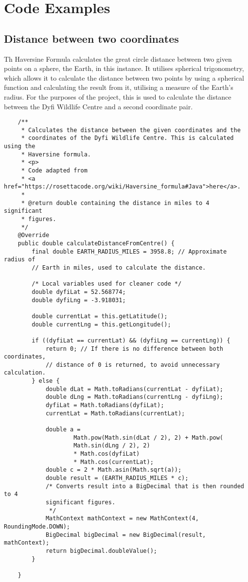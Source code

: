 \chapter{Code Examples}



\section{Distance between two coordinates}
\label{haversine}
Th Haversine Formula calculates the great circle distance between two given points on a sphere, the Earth, in this instance. It utilises spherical trigonometry, which allows it to calculate the distance between two points by using a spherical function and calculating the result from it, utilising a measure of the Earth's radius. For the purposes of the project, this is used to calculate the distance between the Dyfi Wildlife Centre and a second coordinate pair.

\begin{verbatim}
    /**
     * Calculates the distance between the given coordinates and the
     * coordinates of the Dyfi Wildlife Centre. This is calculated using the
     * Haversine formula.
     * <p>
     * Code adapted from
     * <a href="https://rosettacode.org/wiki/Haversine_formula#Java">here</a>.
     *
     * @return double containing the distance in miles to 4 significant
     * figures.
     */
    @Override
    public double calculateDistanceFromCentre() {
        final double EARTH_RADIUS_MILES = 3958.8; // Approximate radius of
        // Earth in miles, used to calculate the distance.

        /* Local variables used for cleaner code */
        double dyfiLat = 52.568774;
        double dyfiLng = -3.918031;

        double currentLat = this.getLatitude();
        double currentLng = this.getLongitude();

        if ((dyfiLat == currentLat) && (dyfiLng == currentLng)) {
            return 0; // If there is no difference between both coordinates,
            // distance of 0 is returned, to avoid unnecessary calculation.
        } else {
            double dLat = Math.toRadians(currentLat - dyfiLat);
            double dLng = Math.toRadians(currentLng - dyfiLng);
            dyfiLat = Math.toRadians(dyfiLat);
            currentLat = Math.toRadians(currentLat);

            double a =
                    Math.pow(Math.sin(dLat / 2), 2) + Math.pow(
                    Math.sin(dLng / 2), 2)
                    * Math.cos(dyfiLat)
                    * Math.cos(currentLat);
            double c = 2 * Math.asin(Math.sqrt(a));
            double result = (EARTH_RADIUS_MILES * c);
            /* Converts result into a BigDecimal that is then rounded to 4
            significant figures.
             */
            MathContext mathContext = new MathContext(4, RoundingMode.DOWN);
            BigDecimal bigDecimal = new BigDecimal(result, mathContext);
            return bigDecimal.doubleValue();
        }

    }
\end{verbatim}    


